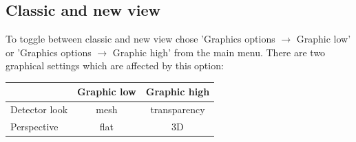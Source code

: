 \documentclass[a4paper,10pt]{article}
\begin{document}
\subsection{Classic and new view}
To toggle between classic and new view chose 'Graphics options $\rightarrow$ Graphic low' or 'Graphics options $\rightarrow$ Graphic high' from the main menu. There are two graphical settings which are affected by this option:
 \begin{center}
 \begin{tabular}[ht]{|l|c|c|}
  \hline
  &Graphic low & Graphic high\\
  \hline
  Detector look & mesh & transparency\\
  Perspective & flat & 3D\\
  \hline
\end{tabular}
\end{center}
\end{document}
